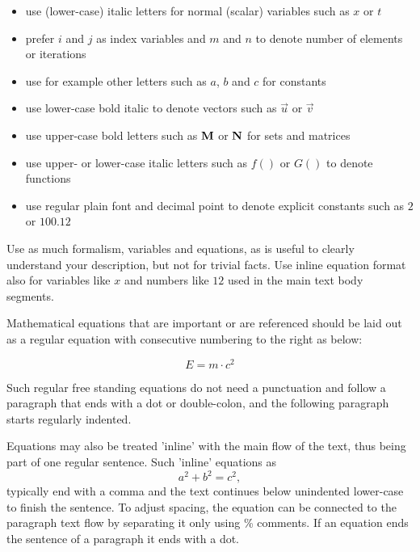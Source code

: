 \documentclass[11pt, a4paper,oneside,chapterprefix=false]{scrbook}
\begin{document}
\begin{itemize}
\item use (lower-case) italic letters for normal (scalar) variables such as $x$ or $t$
\item prefer $i$ and $j$ as index variables and $m$ and $n$ to denote number of elements or iterations
\item use for example other letters such as $a$, $b$ and $c$ for constants
\item use lower-case bold italic to denote vectors such as $\vec{u}$ or $\vec{v}$
\item use upper-case bold letters such as $\mathbf{M}$ or $\mathbf{N}$ for sets and matrices
\item use upper- or lower-case italic letters such as $f()$ or $G()$ to denote functions
\item use regular plain font and decimal point to denote explicit constants such as $2$ or $100.12$
\end{itemize}

Use as much formalism, variables and equations, as is useful to clearly understand your description, but not for trivial facts. Use inline equation format also for variables like $x$ and numbers like $12$ used in the main text body segments.

Mathematical equations that are important or are referenced should be laid out as a  regular equation with consecutive numbering to the right as below:

\begin{equation}
E = m \cdot c^2
\label{eq:einstein}
\end{equation}

Such regular free standing equations do not need a punctuation and follow a paragraph that ends with a dot or double-colon, and the following paragraph starts regularly indented.

Equations may also be treated 'inline' with the main flow of the text, thus being part of one regular sentence. Such 'inline' equations as
%
\begin{equation*}
a^2 + b^2 =  c^2,
\end{equation*}
%
typically end with a comma and the text continues below unindented lower-case to finish the sentence. To adjust spacing, the equation can be connected to the paragraph text flow by separating it only using \% comments. If an equation ends the sentence of a paragraph it ends with a dot.


\end{document}
